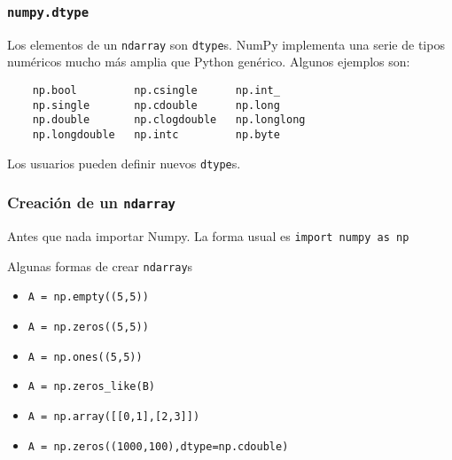 \documentclass{beamer}
\begin{document}
\begin{frame}[fragile]
    \frametitle{{\tt numpy.dtype}}
    Los elementos de un {\tt ndarray} son {\tt dtype}s. 
    NumPy implementa una serie de tipos numéricos mucho más amplia que Python genérico.
    Algunos ejemplos son:
    \vspace{0.3cm}
    \begin{verbatim}
    np.bool         np.csingle      np.int_
    np.single       np.cdouble      np.long
    np.double       np.clogdouble   np.longlong
    np.longdouble   np.intc         np.byte
    \end{verbatim}
    \vspace{0.3cm}    
    Los usuarios pueden definir nuevos {\tt dtype}s.
    \end{frame}

\begin{frame}[fragile]
    \frametitle{Creación de un {\tt ndarray}}
    Antes que nada importar Numpy. La forma usual es \texttt{import numpy as np}
    \begin{block}{Algunas formas de crear {\tt ndarray}s}
        \begin{itemize}
            \item \texttt{A = np.empty((5,5))} 
            \item \texttt{A = np.zeros((5,5))} 
            \item \texttt{A = np.ones((5,5))}  
            \item \texttt{A = np.zeros_like(B)}
            \item \texttt{A = np.array([[0,1],[2,3]])}
            \item \texttt{A = np.zeros((1000,100),dtype=np.cdouble)} 
        \end{itemize}
    \end{block}
    \end{frame}
\end{document}
